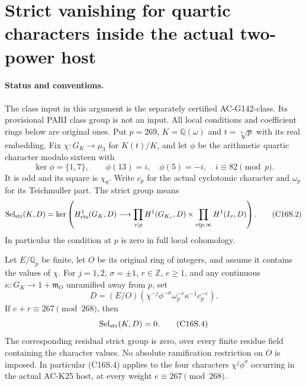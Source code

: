 \section{Strict vanishing for quartic characters inside the actual two-power host}
\label{sec:cubic-conductor16-strict-vanishing}

\paragraph{Status and conventions.}
The class input in this argument is the separately certified
AC-G142-class.  Its provisional PARI class group is not an input.
All local conditions and coefficient rings below are original ones.
Put $p=269$, $K=\mathbb Q(\omega)$ and $t=\sqrt[3]{p}$ with
its real embedding.  Fix $\chi:G_K\longrightarrow\mu_3$ for
$K(t)/K$, and let $\phi$ be the arithmetic quartic character
modulo sixteen with
\[
 \ker\phi=\{1,7\},\qquad \phi(13)=i,\quad
 \phi(5)=-i,\quad i\equiv82\pmod p.
 \tag{C16S.1}
\]
It is odd and its square is $\chi_8$.  Write $c_p$ for the
actual cyclotomic character and $\omega_p$ for its Teichmuller
part.  The strict group means
\[
 \operatorname{Sel}_{\rm str}(K,D)=\ker\left(
 H^1_{\rm cts}(G_K,D)\longrightarrow
 \prod_{v\mid p}H^1(G_{K_v},D)\times
 \prod_{v\nmid p,\infty}H^1(I_v,D)\right).
 \tag{C16S.2}
\]
In particular the condition at $p$ is zero in full local
cohomology.

\begin{theorem}
\label{AC-G142}
Let $E/\mathbb Q_p$ be finite, let $O$ be its original ring of
integers, and assume it contains the values of $\chi$.
For $j=1,2$, $\sigma=\pm1$, $r\in\mathbb Z$, $e\geq1$, and
any continuous $\kappa:G_K\to1+\mathfrak m_O$ unramified away
from $p$, set
\[
 D=(E/O)(\chi^{-j}\phi^{-\sigma}\omega_p^{-r}
                       \kappa^{-1}c_p^{-e}).
 \tag{C16S.3}
\]
If $e+r\equiv267\pmod{268}$, then
\[
                  \operatorname{Sel}_{\rm str}(K,D)=0.
 \tag{C16S.4}
\]
The corresponding residual strict group is zero, over every
finite residue field containing the character values.  No
absolute ramification restriction on $O$ is imposed.
In particular (C16S.4) applies to the four characters
$\chi^j\phi^\sigma$ occurring in the actual AC-K25 host,
at every weight $e\equiv267\pmod{268}$.
\end{theorem}

